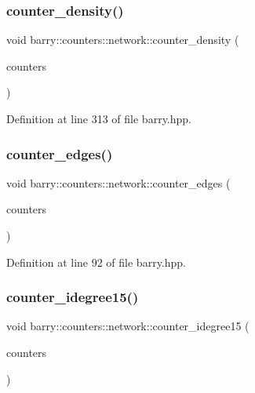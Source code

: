 \subsubsection{\texorpdfstring{counter\+\_\+density()}{counter\_density()}}
{\footnotesize\ttfamily void barry\+::counters\+::network\+::counter\+\_\+density (\begin{DoxyParamCaption}\item[{\hyperlink{namespacebarry_1_1counters_1_1network_a3b3c590303d47840d1967372ae495d95}{Net\+Counter\+Vector} $\ast$}]{counters }\end{DoxyParamCaption})\hspace{0.3cm}{\ttfamily [inline]}}



Definition at line 313 of file barry.\+hpp.

\mbox{\label{namespacebarry_1_1counters_1_1network_a3c0a9e6c5697b3ec65827d405826bb33}} 
\subsubsection{\texorpdfstring{counter\+\_\+edges()}{counter\_edges()}}
{\footnotesize\ttfamily void barry\+::counters\+::network\+::counter\+\_\+edges (\begin{DoxyParamCaption}\item[{\hyperlink{namespacebarry_1_1counters_1_1network_a3b3c590303d47840d1967372ae495d95}{Net\+Counter\+Vector} $\ast$}]{counters }\end{DoxyParamCaption})\hspace{0.3cm}{\ttfamily [inline]}}



Definition at line 92 of file barry.\+hpp.

\mbox{\label{namespacebarry_1_1counters_1_1network_a148e6fbb549eea53ff6d744b0f683ed6}} 
\subsubsection{\texorpdfstring{counter\+\_\+idegree15()}{counter\_idegree15()}}
{\footnotesize\ttfamily void barry\+::counters\+::network\+::counter\+\_\+idegree15 (\begin{DoxyParamCaption}\item[{\hyperlink{namespacebarry_1_1counters_1_1network_a3b3c590303d47840d1967372ae495d95}{Net\+Counter\+Vector} $\ast$}]{counters }\end{DoxyParamCaption})\hspace{0.3cm}{\ttfamily [inline]}}



